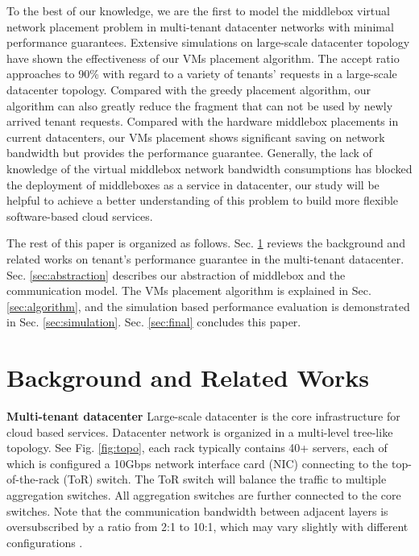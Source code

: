 \documentclass[10pt, conference, letterpaper]{IEEEtran}
\begin{document}
To the best of our knowledge, we are the first to model the middlebox virtual network placement problem in multi-tenant datacenter networks with minimal performance guarantees. Extensive simulations on large-scale datacenter topology have shown the effectiveness of our VMs placement algorithm. The accept ratio approaches to 90\% with regard to a variety of tenants' requests in a large-scale datacenter topology. Compared with the greedy placement algorithm, our algorithm can also greatly reduce the fragment that can not be used by newly arrived tenant requests. Compared with the hardware middlebox placements in current datacenters, our VMs placement shows significant saving on network bandwidth but provides the performance guarantee. Generally, the lack of knowledge of the virtual middlebox network bandwidth consumptions has blocked the deployment of middleboxes as a service in datacenter, our study will be helpful to achieve a better understanding of this problem to build more flexible software-based cloud services.


The rest of this paper is organized as follows. Sec. \ref{sec:background} reviews the background and related works on tenant's performance guarantee in the multi-tenant datacenter. Sec. \ref{sec:abstraction} describes our abstraction of middlebox and the communication model. The VMs placement algorithm is explained in Sec. \ref{sec:algorithm}, and the simulation based performance evaluation is demonstrated in Sec. \ref{sec:simulation}. Sec. \ref{sec:final} concludes this paper.

\section{Background and Related Works}\label{sec:background}
\textbf{Multi-tenant datacenter }
Large-scale datacenter is the core infrastructure for cloud based services. Datacenter network is organized in a multi-level tree-like topology. See Fig. \ref{fig:topo}, each rack typically contains 40+ servers, each of which is configured a 10Gbps network interface card (NIC) connecting to the top-of-the-rack (ToR) switch. The ToR switch will balance the traffic to multiple aggregation switches. All aggregation switches are further connected to the core switches. Note that the communication bandwidth between adjacent layers is oversubscribed by a ratio from 2:1 to 10:1, which may vary slightly with different configurations \cite{B13cta, williamson2010has}.
\end{document}

